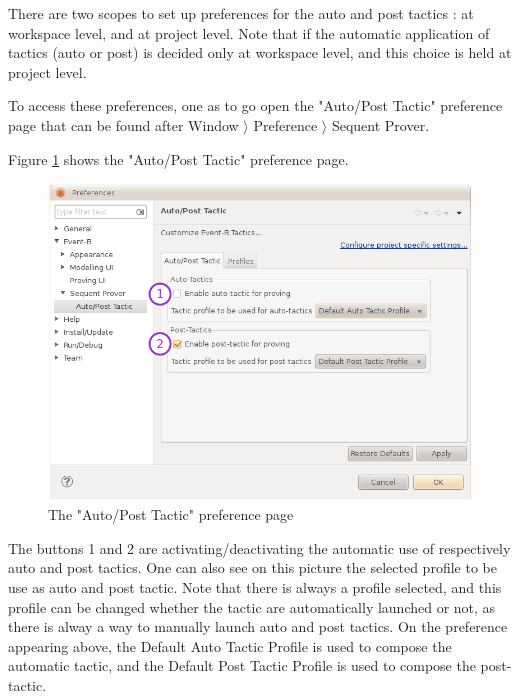 There are two scopes to set up preferences for the auto and post tactics : at workspace level, and at project level. Note that if the automatic application of tactics (auto or post) is decided only at workspace level, and this choice is held at project level.

To access these preferences, one as to go open the "Auto/Post Tactic" preference page that can be found after \textsf{Window $\rangle$ Preference $\rangle$ Sequent Prover}.

Figure \ref{fig_ref_01_preferences7} shows the "Auto/Post Tactic" preference page.

\begin{figure}[!h]
\begin{center}
	\includegraphics{img/reference/ref_01_preferences7.png}
	\caption{The "Auto/Post Tactic" preference page}
	\label{fig_ref_01_preferences7}
\end{center}
\end{figure}

The buttons 1 and 2 are activating/deactivating the automatic use of respectively auto and post tactics. One can also see on this picture the selected profile to be use as auto and post tactic. Note that there is always a profile selected, and this profile can be changed whether the tactic are automatically launched or not, as there is alway a way to manually launch auto and post tactics. On the preference appearing above, the Default Auto Tactic Profile is used to compose the automatic tactic, and the Default Post Tactic Profile is used to compose the post-tactic.


